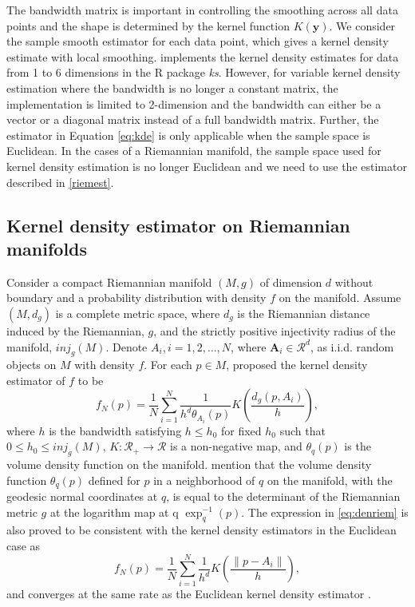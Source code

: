 \documentclass[11pt,a4paper,]{article}
\begin{document}
The bandwidth matrix is important in controlling the smoothing across
all data points and the shape is determined by the kernel function
\(K(\pmb{y})\). We consider the sample smooth estimator for each data
point, which gives a kernel density estimate with local smoothing.
\textcite{Duong2007-up} implements the kernel density estimates for data from 1 to
6 dimensions in the R package \emph{ks}. However, for variable kernel density
estimation where the bandwidth is no longer a constant matrix, the
implementation is limited to 2-dimension and the bandwidth can either be
a vector or a diagonal matrix instead of a full bandwidth matrix.
Further, the estimator in Equation \eqref{eq:kde} is only applicable when
the sample space is Euclidean. In the cases of a Riemannian manifold,
the sample space used for kernel density estimation is no longer
Euclidean and we need to use the estimator described in
\autoref{riemest}.

\hypertarget{riemest}{%
\subsection{Kernel density estimator on Riemannian manifolds}\label{riemest}}

Consider a compact Riemannian manifold \((M, g)\) of dimension \(d\) without
boundary and a probability distribution with density \(f\) on the
manifold. Assume \((M, d_g)\) is a complete metric space, where \(d_g\) is
the Riemannian distance induced by the Riemannian, \(g\), and the strictly
positive injectivity radius \autocite{Chavel2006-mp} of the manifold,
\(inj_g(M)\). Denote \(A_i, i = 1, 2, \dots, N\), where
\(\pmb{A}_i \in \mathcal{R}^d\), as i.i.d. random objects on \(M\) with
density \(f\). For each \(p\in M\), \textcite{Pelletier2005-vu} proposed the kernel
density estimator of \(f\) to be \begin{equation}
\label{eq:denriem}
f_N(p) = \frac{1}{N} \sum_{i=1}^{N} \frac{1}{h^d \theta_{A_i}(p)} K(\frac{d_g(p, A_i)}{h}),
\end{equation} where \(h\) is the bandwidth satisfying \(h \leq h_0\) for
fixed \(h_0\) such that \(0\leq h_0\leq inj_g(M)\),
\(K: \mathcal{R}_{+} \rightarrow \mathcal{R}\) is a non-negative map, and
\(\theta_{q}(p)\) is the volume density function on the manifold.
\textcite{Pelletier2005-vu} mention that the volume density function \(\theta_q(p)\)
defined for \(p\) in a neighborhood of \(q\) on the manifold, with the
geodesic normal coordinates at \(q\), is equal to the determinant of the
Riemannian metric \(g\) at the logarithm map at q \(\exp_q^{-1}(p)\). The
expression in \eqref{eq:denriem} is also proved to be consistent with the
kernel density estimators in the Euclidean case as \begin{equation}
\label{eq:denconsist}
f_N(p) = \frac{1}{N} \sum_{i=1}^{N} \frac{1}{h^d} K(\frac{\|p-A_i\|}{h}),
\end{equation} and converges at the same rate as the Euclidean kernel
density estimator \autocite{Henry2009-ll}.
\end{document}
